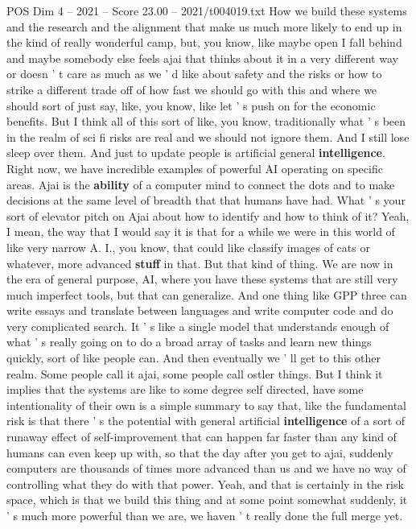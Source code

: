\begin{textsample}{POS Dim 4 – 2021 – Score 23.00 – 2021/t004019.txt}
How we build these systems and the research and the alignment that make us much more likely to end up in the kind of really wonderful camp, but, you know, like maybe open I fall behind and maybe somebody else feels ajai that thinks about it in a very different way or doesn ' t care as much as we ' d like about safety and the risks or how to strike a different trade off of how fast we should go with this and where we should sort of just say, like, you know, like let ' s push on for the economic benefits.
But I think all of this sort of like, you know, traditionally what ' s been in the realm of sci fi risks are real and we should not ignore them.
And I still lose sleep over them.
And just to update people is artificial general \textbf{intelligence}.
Right now, we have incredible examples of powerful AI operating on specific areas.
Ajai is the \textbf{ability} of a computer mind to connect the dots and to make decisions at the same level of breadth that that humans have had.
What ' s your sort of elevator pitch on Ajai about how to identify and how to think of it?
Yeah, I mean, the way that I would say it is that for a while we were in this world of like very narrow A.
I., you know, that could like classify images of cats or whatever, more advanced \textbf{stuff} in that.
But that kind of thing.
We are now in the era of general purpose, AI, where you have these systems that are still very much imperfect tools, but that can generalize.
And one thing like GPP three can write essays and translate between languages and write computer code and do very complicated search.
It ' s like a single model that understands enough of what ' s really going on to do a broad array of tasks and learn new things quickly, sort of like people can.
And then eventually we ' ll get to this other realm.
Some people call it ajai, some people call ostler things.
But I think it implies that the systems are like to some degree self directed, have some intentionality of their own is a simple summary to say that, like the fundamental risk is that there ' s the potential with general artificial \textbf{intelligence} of a sort of runaway effect of self-improvement that can happen far faster than any kind of humans can even keep up with, so that the day after you get to ajai, suddenly computers are thousands of times more advanced than us and we have no way of controlling what they do with that power.
Yeah, and that is certainly in the risk space, which is that we build this thing and at some point somewhat suddenly, it ' s much more powerful than we are, we haven ' t really done the full merge yet.

\end{textsample}
